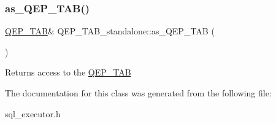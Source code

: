 \subsubsection{\texorpdfstring{as\+\_\+\+Q\+E\+P\+\_\+\+T\+A\+B()}{as\_QEP\_TAB()}}
{\footnotesize\ttfamily \mbox{\hyperlink{classQEP__TAB}{Q\+E\+P\+\_\+\+T\+AB}}\& Q\+E\+P\+\_\+\+T\+A\+B\+\_\+standalone\+::as\+\_\+\+Q\+E\+P\+\_\+\+T\+AB (\begin{DoxyParamCaption}{ }\end{DoxyParamCaption})\hspace{0.3cm}{\ttfamily [inline]}}

\begin{DoxyReturn}{Returns}
access to the \mbox{\hyperlink{classQEP__TAB}{Q\+E\+P\+\_\+\+T\+AB}} 
\end{DoxyReturn}


The documentation for this class was generated from the following file\+:\begin{DoxyCompactItemize}
\item 
sql\+\_\+executor.\+h\end{DoxyCompactItemize}
